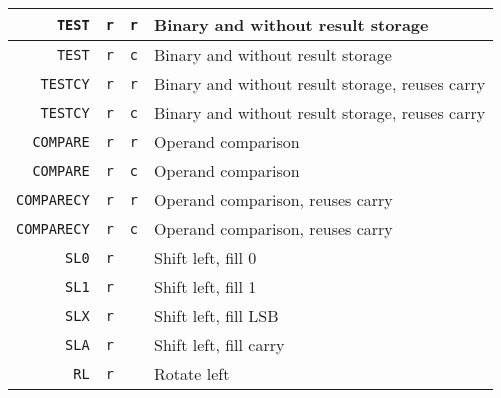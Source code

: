 \begin{table}[H]
\begin{tabular}{| r | c | c | l |}
\verb|TEST|&\verb|r|&\verb|r|& Binary and without result storage\\ \hline
\verb|TEST|&\verb|r|&\verb|c|& Binary and without result storage\\ \hline
\verb|TESTCY|&\verb|r|&\verb|r|& Binary and without result storage, reuses carry\\ \hline
\verb|TESTCY|&\verb|r|&\verb|c|& Binary and without result storage, reuses carry\\ \hline
\verb|COMPARE|&\verb|r|&\verb|r|& Operand comparison\\ \hline
\verb|COMPARE|&\verb|r|&\verb|c|& Operand comparison\\ \hline
\verb|COMPARECY|&\verb|r|&\verb|r|& Operand comparison, reuses carry\\ \hline
\verb|COMPARECY|&\verb|r|&\verb|c|& Operand comparison, reuses carry\\ \hline

\verb|SL0|&\verb|r|&\verb||& Shift left, fill 0 \\ \hline
\verb|SL1|&\verb|r|&\verb||& Shift left, fill 1 \\ \hline
\verb|SLX|&\verb|r|&\verb||& Shift left, fill LSB \\ \hline
\verb|SLA|&\verb|r|&\verb||& Shift left, fill carry \\ \hline
\verb|RL|&\verb|r|&\verb||& Rotate left \\ \hline
\end{tabular}
\end{table}

